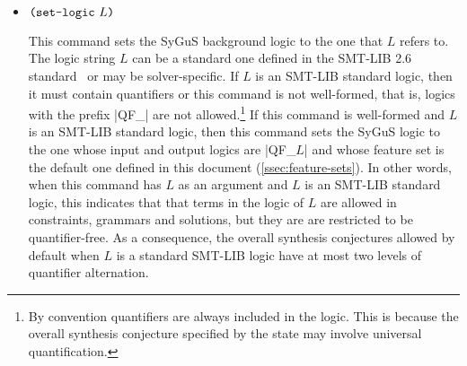 \documentclass[english,a4paper,10pt]{article}
\begin{document}
\begin{itemize}
\item $\texttt{(}\texttt{set-logic}\mbox{ }L\texttt{)}$

This command sets the SyGuS background logic to the one that $L$ refers to.
The logic string $L$ can be a standard one defined in the SMT-LIB 2.6 standard~\cite{BarFT-RR-17}
or may be solver-specific.
If $L$ is an SMT-LIB standard logic,
then it must contain quantifiers or this command is not well-formed,
that is, logics with the prefix \code|QF_| are not allowed.\footnote{
By convention quantifiers are always included in the logic. This is because
the overall synthesis conjecture specified by the
state may involve universal quantification.
}
If this command is well-formed and $L$ is an SMT-LIB standard logic,
then this command sets the SyGuS logic to the one whose
input and output logics are \code|QF_$L$| and whose feature
set is the default one defined in this document (\cref{ssec:feature-sets}).
In other words, when this command has $L$ as an argument
and $L$ is an SMT-LIB standard logic,
this indicates that that terms in the logic of $L$ are
allowed in constraints, grammars and solutions,
but they are are restricted to be quantifier-free.
As a consequence,  the overall synthesis conjectures 
allowed by default when $L$ is a standard SMT-LIB logic
have at most two levels of quantifier alternation.

\begin{comment}
\item $\paren{\setlogicinputkwd\mbox{ }S}$

This command sets the input logic component of the SyGuS background logic
to the one $S$ refers to,
which can be a standard one defined in SMT-LIB~\cite{BarFT-RR-17}
or may be solver-specific.
This command adds the set of sort and function symbols
from the logic to the current signature.
Some of the standard logics defined by SMT-LIB that can be an argument of this
command are given in \cref{ssec:smt-logic}.


\end{comment}
\end{itemize}
\end{document}
